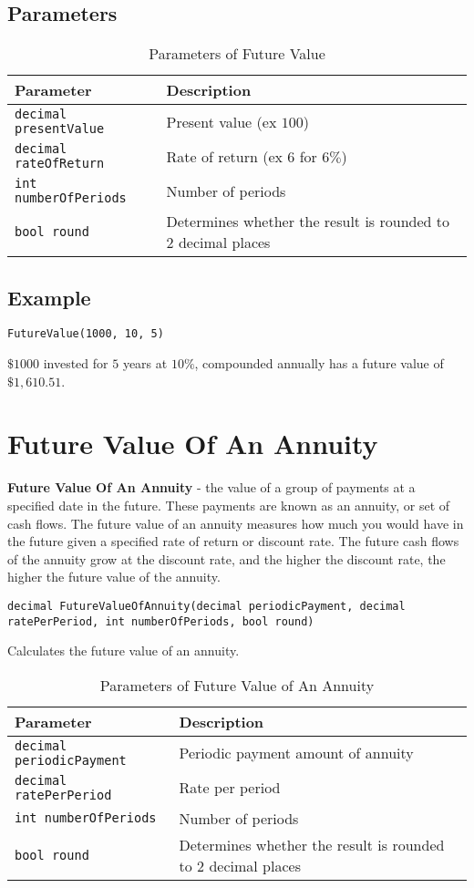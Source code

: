 \subsection{Parameters}
\begin{table}[h]
\begin{tabular}{|l|l|}
\hline
\textbf{Parameter} & \textbf{Description}\\
\hline
\verb|decimal presentValue| & Present value (ex $100$)\\
\verb|decimal rateOfReturn| & Rate of return (ex $6$ for $6\%$)\\
\verb|int numberOfPeriods| & Number of periods\\
\verb|bool round| & Determines whether the result is rounded to $2$ decimal places\\
\hline
\end{tabular}
\caption{Parameters of Future Value}
\end{table}

\subsection{Example}
\begin{lstlisting}
FutureValue(1000, 10, 5)
\end{lstlisting}
$\$1000$ invested for $5$ years at $10\%$, compounded annually has a future value of $\$1,610.51$.






\section{Future Value Of An Annuity}
\textbf{Future Value Of An Annuity} - the value of a group of payments at a specified date in the future. These payments are known as an annuity, or set of cash flows. The future value of an annuity measures how much you would have in the future given a specified rate of return or discount rate. The future cash flows of the annuity grow at the discount rate, and the higher the discount rate, the higher the future value of the annuity.
\begin{lstlisting}
decimal FutureValueOfAnnuity(decimal periodicPayment, decimal ratePerPeriod, int numberOfPeriods, bool round)
\end{lstlisting}
Calculates the future value of an annuity.
\begin{table}[h]
\begin{tabular}{|l|l|}
\hline
\textbf{Parameter} & \textbf{Description}\\
\hline
\verb|decimal periodicPayment| & Periodic payment amount of annuity\\
\verb|decimal ratePerPeriod| & Rate per period\\
\verb|int numberOfPeriods| & Number of periods\\
\verb|bool round| & Determines whether the result is rounded to $2$ decimal places\\
\hline
\end{tabular}
\caption{Parameters of Future Value of An Annuity}
\end{table}
